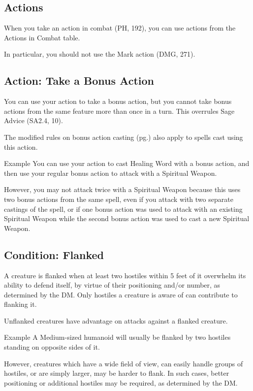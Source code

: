 \documentclass[letterpaper,twocolumn,openany,nodeprecatedcode]{dndbook}
\begin{document}
\subsection{Actions}
When you take an action in combat (PH, 192), you can use actions from the Actions in Combat table. 

In particular, you should not use the Mark action (DMG, 271).

\subsection{Action: Take a Bonus Action}
\label{takeABonusAction}
You can use your action to take a bonus action, but you cannot take bonus actions from the same feature more than once in a turn. This overrules Sage Advice (SA2.4, 10).

The modified rules on bonus action casting (pg.\pageref{bonusActionSpells}) also apply to spells cast using this action.

\begin{DndComment}{Example}
You can use your action to cast Healing Word with a bonus action, and then use your regular bonus action to attack with a Spiritual Weapon. 

However, you may not attack twice with a Spiritual Weapon because this uses two bonus actions from the same spell, even if you attack with two separate castings of the spell, or if one bonus action was used to attack with an existing Spiritual Weapon while the second bonus action was used to cast a new Spiritual Weapon.
\end{DndComment}

\subsection{Condition: Flanked}
A creature is flanked when at least two hostiles within 5 feet of it overwhelm its ability to defend itself, by virtue of their positioning and/or number, as determined by the DM. Only hostiles a creature is aware of can contribute to flanking it.

Unflanked creatures have advantage on attacks against a flanked creature.

\begin{DndComment}{Example}
A Medium-sized humanoid will usually be flanked by two hostiles standing on opposite sides of it.

However, creatures which have a wide field of view, can easily handle groups of hostiles, or are simply larger, may be harder to flank. In such cases, better positioning or additional hostiles may be required, as determined by the DM.
\end{DndComment}
\end{document}
